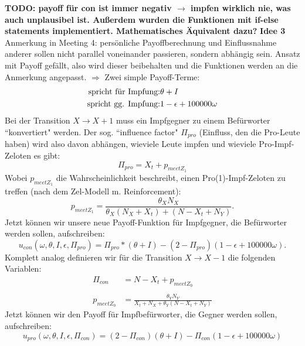 \documentclass[10pt,a4paper]{article}
\begin{document}
\textbf{TODO: payoff für con ist immer negativ $\rightarrow$ impfen wirklich nie, was auch unplausibel ist. Außerdem wurden die Funktionen mit if-else statements implementiert. Mathematisches Äquivalent dazu?}
\newpage
\textbf{Idee 3}\newline
Anmerkung in Meeting 4: persönliche Payoffberechnung und Einflussnahme anderer sollen nicht parallel voneinander passieren, sondern abhängig sein. Ansatz mit Payoff gefällt, also wird dieser beibehalten und die Funktionen werden an die Anmerkung angepasst.\newline
$\Rightarrow$ Zwei simple Payoff-Terme:
\begin{align*}
	\textnormal{spricht für Impfung:}& \theta + I\\
	\textnormal{spricht gg. Impfung:}& 1-\epsilon + 100000\omega
\end{align*}
Bei der Transition $X \rightarrow X + 1$ muss ein Impfgegner zu einem Befürworter ``konvertiert" werden. Der sog. ``influence factor" $\Pi_{pro}$ (Einfluss, den die Pro-Leute haben) wird also davon abhängen, wieviele Leute impfen und wieviele Pro-Impf-Zeloten es gibt:
\begin{equation}
	\Pi_{pro} = X_t + p_{meet Z_1}
\end{equation}
Wobei $p_{meet Z_1}$ die Wahrscheinlichkeit beschreibt, einen Pro(1)-Impf-Zeloten zu treffen (nach dem Zel-Modell m. Reinforcement):
\begin{equation}
	p_{meet Z_1} = \frac{\theta_X N_X}{\theta_X(N_X + X_t) + (N-X_t + N_Y)}.
\end{equation}
Jetzt können wir unsere neue Payoff-Funktion für Impfgegner, die Befürworter werden sollen, aufschreiben:
\begin{equation}
	u_{con}\left(\omega, \theta, I, \epsilon, \Pi_{pro}\right) = \Pi_{pro} * (\theta + I) - (2 -\Pi_{pro})(1-\epsilon + 100000\omega).
\end{equation}
Komplett analog definieren wir für die Transition $X \rightarrow X-1$ die folgenden Variablen:
\begin{align*}
	\Pi_{con} &= N-X_t + p_{meet Z_0}\\
	&\\
	p_{meet Z_0} &= \frac{\theta_Y N_Y}{X_t + N_X + \theta_Y(N-X_t+N_Y)}
\end{align*}
Jetzt können wir den Payoff für Impfbefürworter, die Gegner werden sollen, aufschreiben:
\begin{equation}
	u_{pro}\left(\omega, \theta, I, \epsilon, \Pi_{con}\right) = (2-\Pi_{con})(\theta + I) - \Pi_{con} (1-\epsilon+100000\omega)
\end{equation}
\end{document}
